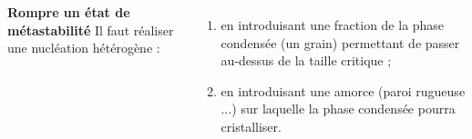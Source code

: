 \documentclass[12pt, a3paper, portrait]{tikzposter}
\begin{document}
\begin{columns}
{\textbf{Rompre un état de métastabilité} Il faut réaliser une nucléation hétérogène :
\begin{enumerate}
\item en introduisant une fraction de la phase condensée (un grain) permettant de passer au-dessus de la taille critique ;
\item en introduisant une amorce (paroi rugueuse $\ldots$) sur laquelle la phase condensée pourra cristalliser.
\end{enumerate}

}

\end{columns}

\end{document}
